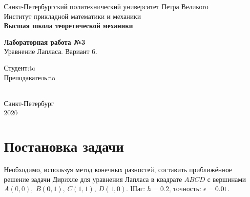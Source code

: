 \documentclass[a4paper,fontsize=14pt]{article}
\begin{document}
	
	\begin{titlepage}
		\newpage
		
		\begin{center}
			Санкт-Петербургский политехнический университет Петра Великого \\
			Институт прикладной математики и механики \\
			\textbf{Высшая школа теоретической механики}
		\end{center}
		
		\vspace{10em}
		
		\begin{center}
			\Large{\textbf{Лабораторная работа №3}} \\
			Уравнение Лапласа. Вариант 6. \\
		\end{center}
		
		\vspace{20em}
		
		
		
		\newbox{\lbox}
		\newlength{\maxl}
		\setlength{\maxl}{\wd\lbox}
		\hfill\parbox{12cm}{
			\hspace*{5cm}\hspace*{-5cm}Студент:\hfill\hbox to\\
			\hspace*{5cm}\hspace*{-5cm}Преподаватель:\hfill\hbox to\\
			\\
		}
		
		
		\vspace{\fill}
		
		\begin{center}
			Санкт-Петербург \\2020
		\end{center}
		
	\end{titlepage}
	
	\tableofcontents
	
	\newpage
	
	\section{Постановка задачи}
	
	Необходимо, используя метод конечных разностей, составить приближённое решение задачи Дирихле для уравнения Лапласа в квадрате $ABCD$ с вершинами $A(0, 0), \; B(0, 1), \: C(1, 1), \: D(1, 0)$. Шаг: $h = 0.2$, точность: $\epsilon = 0.01$. \\
	
\end{document}
